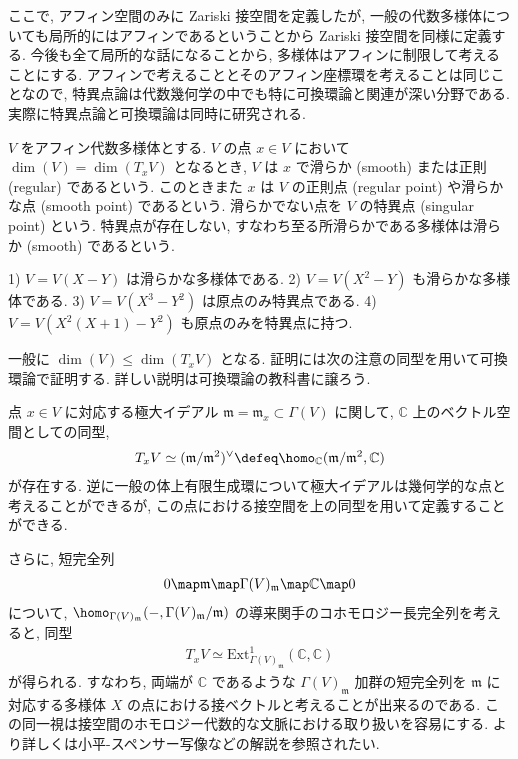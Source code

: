 \documentclass[openany, a4paper, oneside]{jsbook}
\begin{document}
ここで, アフィン空間のみに Zariski 接空間を定義したが,
一般の代数多様体についても局所的にはアフィンであるということから Zariski 接空間を同様に定義する.
今後も全て局所的な話になることから, 多様体はアフィンに制限して考えることにする.
アフィンで考えることとそのアフィン座標環を考えることは同じことなので,
特異点論は代数幾何学の中でも特に可換環論と関連が深い分野である.
実際に特異点論と可換環論は同時に研究される.
\begin{defn}[特異点]
$V$ をアフィン代数多様体とする.
$V$ の点 $x \in V$ において $\dim (V)=\dim (T_xV)$ となるとき,
$V$ は $x$ で滑らか (smooth) または正則 (regular) であるという.
このときまた $x$ は $V$ の正則点 (regular point) や滑らかな点 (smooth point) であるという.
滑らかでない点を $V$ の特異点 (singular point) という.
特異点が存在しない, すなわち至る所滑らかである多様体は滑らか (smooth) であるという. \fin
\end{defn}
\begin{ex}
1) $V=V (X-Y)$ は滑らかな多様体である.
2) $V=V (X^2-Y)$ も滑らかな多様体である.
3) $V=V (X^3-Y^2)$ は原点のみ特異点である.
4) $V=V (X^2 (X+1)-Y^2)$ も原点のみを特異点に持つ. \fin
\end{ex}
\begin{rem}
一般に $\dim (V) \leq \dim (T_x V)$ となる.
証明には次の注意の同型を用いて可換環論で証明する.
詳しい説明は可換環論の教科書に譲ろう. \fin
\end{rem}
\begin{rem}
点 $x \in V$ に対応する極大イデアル $\mathfrak{m} = \mathfrak{m}_x \subset \Gamma (V)$ に関して,
$\mathbb{C}$ 上のベクトル空間としての同型,
\begin{align}
 T_x V
 \simeq
 (\mathfrak{m}/\mathfrak{m}^2)^{\vee}
 \defeq
 \homo_{\mathbb{C}}(\mathfrak{m} / \mathfrak{m}^2, \mathbb{C})
\end{align}
が存在する.
逆に一般の体上有限生成環について極大イデアルは幾何学的な点と考えることができるが,
この点における接空間を上の同型を用いて定義することができる. \fin
\end{rem}
\begin{rem}
さらに, 短完全列
\begin{align}
 0 \map \mathfrak{m} \map \Gamma (V)_{\mathfrak{m}} \map \mathbb{C} \map 0
\end{align}
について, $\homo_{\Gamma (V)_{\mathfrak{m}}}(-, \Gamma (V)_{\mathfrak{m}}/\mathfrak{m})$ の導来関手のコホモロジー長完全列を考えると,
同型
\begin{align}
 T_xV
 \simeq
 \mathrm{Ext}_{\Gamma (V)_{\mathfrak{m}}}^1 (\mathbb{C},\mathbb{C})
\end{align}
が得られる.
すなわち, 両端が $\mathbb{C}$ であるような $\Gamma (V)_{\mathfrak{m}}$ 加群の短完全列を
$\mathfrak{m}$ に対応する多様体 $X$ の点における接ベクトルと考えることが出来るのである.
この同一視は接空間のホモロジー代数的な文脈における取り扱いを容易にする.
より詳しくは小平-スペンサー写像などの解説を参照されたい. \fin
\end{rem}
\end{document}
